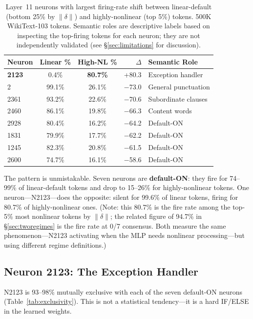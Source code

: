 \documentclass{article}
\begin{document}
\begin{table}[t]
\caption{Layer~11 neurons with largest firing-rate shift between linear-default (bottom 25\%
  by $\|\delta\|$) and highly-nonlinear (top 5\%) tokens. 500K WikiText-103 tokens.
  Semantic roles are descriptive labels based on inspecting the top-firing tokens for each
  neuron; they are not independently validated (see \S\ref{sec:limitations} for discussion).}
\label{tab:neurons}
\centering
\begin{tabular}{lccrl}
\toprule
Neuron & Linear \% & High-NL \% & $\Delta$ & Semantic Role \\
\midrule
\textbf{2123} & 0.4\% & \textbf{80.7\%} & +80.3 & Exception handler \\
2    & 99.1\% & 26.1\% & $-$73.0 & General punctuation \\
2361 & 93.2\% & 22.6\% & $-$70.6 & Subordinate clauses \\
2460 & 86.1\% & 19.8\% & $-$66.3 & Content words \\
2928 & 80.4\% & 16.2\% & $-$64.2 & Default-ON \\
1831 & 79.9\% & 17.7\% & $-$62.2 & Default-ON \\
1245 & 82.3\% & 20.8\% & $-$61.5 & Default-ON \\
2600 & 74.7\% & 16.1\% & $-$58.6 & Default-ON \\
\bottomrule
\end{tabular}
\end{table}

The pattern is unmistakable. Seven neurons are \textbf{default-ON}: they fire for 74--99\% of
linear-default tokens and drop to 15--26\% for highly-nonlinear tokens. One neuron---N2123---does
the opposite: silent for 99.6\% of linear tokens, firing for 80.7\% of highly-nonlinear ones.
(Note: this 80.7\% is the fire rate among the top-5\% most nonlinear tokens by $\|\delta\|$;
the related figure of 94.7\% in \S\ref{sec:tworegimes} is the fire rate at 0/7 consensus.
Both measure the same phenomenon---N2123 activating when the MLP needs nonlinear
processing---but using different regime definitions.)

\subsection{Neuron 2123: The Exception Handler}

N2123 is 93--98\% mutually exclusive with each of the seven default-ON neurons
(Table~\ref{tab:exclusivity}). This is not a statistical tendency---it is a hard IF/ELSE in the
learned weights.
\end{document}

